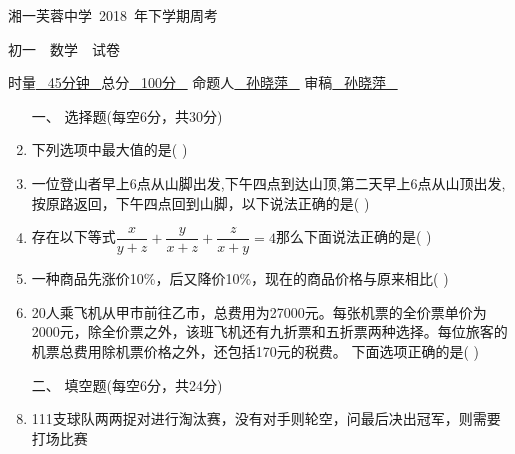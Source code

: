 \documentclass[12pt,landscape,UTF8,onecolumn]{ctexart}
\begin{document}
  \noindent	
  \begin{spacing}{1.5}
    \begin{center}
       \heiti 湘一芙蓉中学~2018~年下学期周考

      初一~~数学~~试卷

       时量\underline{~ 45分钟 ~}总分\underline{~ 100分 ~} 命题人\underline{~ 孙晓萍 ~} 审稿\underline{~ 孙晓萍 ~}
    
    \end{center}
  \end{spacing}
  \vspace{-10pt} 
  \begin{spacing}{1.3}
    \begin{enumerate} [1、]
      \item[\heiti 一、] {\heiti 选择题(每空6分，共30分)}

      \item 下列选项中最大值的是( )

      \item 一位登山者早上6点从山脚出发,下午四点到达山顶,第二天早上6点从山顶出发,按原路返回，下午四点回到山脚，以下说法正确的是( )

      \item 存在以下等式$\dfrac x{y+z} + \dfrac y{x+z} + \dfrac z{x+y} = 4$那么下面说法正确的是( )

      \item 一种商品先涨价10\%，后又降价10\%，现在的商品价格与原来相比( )

      \item 20人乘飞机从甲市前往乙市，总费用为27000元。每张机票的全价票单价为2000元，除全价票之外，该班飞机还有九折票和五折票两种选择。每位旅客的机票总费用除机票价格之外，还包括170元的税费。 下面选项正确的是( )

      \item[\heiti 二、] { \heiti 填空题(每空6分，共24分) }

      \item 111支球队两两捉对进行淘汰赛，没有对手则轮空，问最后决出冠军，则需要打\tk{}场比赛


\end{enumerate}
\end{spacing}
\end{document}

